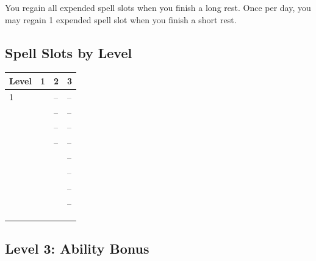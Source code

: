 \documentclass[12pt,letterpaper,twocolumn,openany,nodeprecatedcode,bg=none]{dndbook}
\let\oldsubsection\subsection
\renewcommand{\subsection}[1]{%
  \needspace{5\baselineskip}%
  \oldsubsection{#1}%
}
\begin{document}
You regain all expended spell slots when you finish a long rest. Once
per day, you may regain 1 expended spell slot when you finish a short
rest.

\subsection{Spell Slots by Level}\label{spell-slots-by-level}


{\def\LTcaptype{none} %
\begin{table}[!htbp]
\centering
\begin{tabular}{@{}
  >{\raggedright\arraybackslash}p{}
  >{\raggedright\arraybackslash}p{}
  >{\raggedright\arraybackslash}p{}
  >{\raggedright\arraybackslash}p{}@{}}
\toprule\noalign{}
\begin{minipage}[b]{\linewidth}\raggedright
Level
\end{minipage} & \begin{minipage}[b]{\linewidth}\raggedright
1
\end{minipage} & \begin{minipage}[b]{\linewidth}\raggedright
2
\end{minipage} & \begin{minipage}[b]{\linewidth}\raggedright
3
\end{minipage} \\
\midrule\noalign{}
1 & 1 & -- & -- \\
2 & 2 & -- & -- \\
3 & 2 & -- & -- \\
4 & 3 & -- & -- \\
5 & 4 & 1 & -- \\
6 & 4 & 2 & -- \\
7 & 4 & 2 & -- \\
8 & 4 & 3 & -- \\
9 & 4 & 3 & 1 \\
10 & 4 & 3 & 2 \\
\bottomrule\noalign{}
\end{tabular}
\end{table}
}

\subsection{Level 3: Ability Bonus}\label{level-3-ability-bonus}
\end{document}
